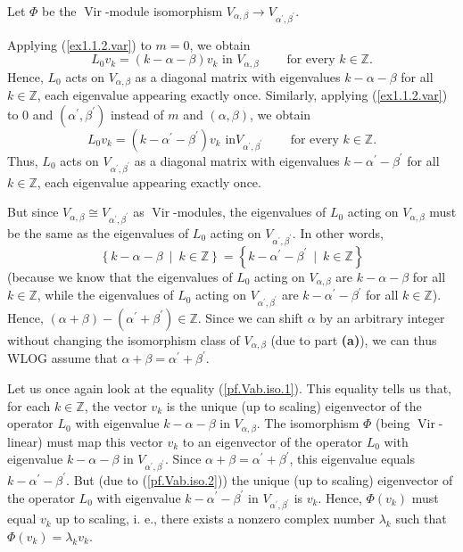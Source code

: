 \documentclass[etingof-lie.tex]{subfiles}
\begin{document}
Let $\Phi$ be the $\operatorname*{Vir}$-module isomorphism $V_{\alpha,\beta
}\rightarrow V_{\alpha^{\prime},\beta^{\prime}}$.

Applying (\ref{ex1.1.2.var}) to $m=0$, we obtain%
\begin{equation}
L_{0}v_{k}=\left(  k-\alpha-\beta\right)  v_{k}\text{ in }V_{\alpha,\beta
}\ \ \ \ \ \ \ \ \ \ \text{for every }k\in\mathbb{Z}. \label{pf.Vab.iso.1}%
\end{equation}
Hence, $L_{0}$ acts on $V_{\alpha,\beta}$ as a diagonal matrix with
eigenvalues $k-\alpha-\beta$ for all $k\in\mathbb{Z}$, each eigenvalue
appearing exactly once. Similarly, applying (\ref{ex1.1.2.var}) to $0$ and
$\left(  \alpha^{\prime},\beta^{\prime}\right)  $ instead of $m$ and $\left(
\alpha,\beta\right)  $, we obtain%
\begin{equation}
L_{0}v_{k}=\left(  k-\alpha^{\prime}-\beta^{\prime}\right)  v_{k}\text{ in
}V_{\alpha^{\prime},\beta^{\prime}}\ \ \ \ \ \ \ \ \ \ \text{for every }%
k\in\mathbb{Z}. \label{pf.Vab.iso.2}%
\end{equation}
Thus, $L_{0}$ acts on $V_{\alpha^{\prime},\beta^{\prime}}$ as a diagonal
matrix with eigenvalues $k-\alpha^{\prime}-\beta^{\prime}$ for all
$k\in\mathbb{Z}$, each eigenvalue appearing exactly once.

But since $V_{\alpha,\beta}\cong V_{\alpha^{\prime},\beta^{\prime}}$ as
$\operatorname*{Vir}$-modules, the eigenvalues of $L_{0}$ acting on
$V_{\alpha,\beta}$ must be the same as the eigenvalues of $L_{0}$ acting on
$V_{\alpha^{\prime},\beta^{\prime}}$. In other words,%
\[
\left\{  k-\alpha-\beta\ \mid\ k\in\mathbb{Z}\right\}  =\left\{
k-\alpha^{\prime}-\beta^{\prime}\ \mid\ k\in\mathbb{Z}\right\}
\]
(because we know that the eigenvalues of $L_{0}$ acting on $V_{\alpha,\beta}$
are $k-\alpha-\beta$ for all $k\in\mathbb{Z}$, while the eigenvalues of
$L_{0}$ acting on $V_{\alpha^{\prime},\beta^{\prime}}$ are $k-\alpha^{\prime
}-\beta^{\prime}$ for all $k\in\mathbb{Z}$). Hence, $\left(  \alpha
+\beta\right)  -\left(  \alpha^{\prime}+\beta^{\prime}\right)  \in\mathbb{Z}$.
Since we can shift $\alpha$ by an arbitrary integer without changing the
isomorphism class of $V_{\alpha,\beta}$ (due to part \textbf{(a)}), we can
thus WLOG assume that $\alpha+\beta=\alpha^{\prime}+\beta^{\prime}$.

Let us once again look at the equality (\ref{pf.Vab.iso.1}). This equality
tells us that, for each $k\in\mathbb{Z}$, the vector $v_{k}$ is the unique (up
to scaling) eigenvector of the operator $L_{0}$ with eigenvalue $k-\alpha
-\beta$ in $V_{\alpha,\beta}$. The isomorphism $\Phi$ (being
$\operatorname*{Vir}$-linear) must map this vector $v_{k}$ to an eigenvector
of the operator $L_{0}$ with eigenvalue $k-\alpha-\beta$ in $V_{\alpha
^{\prime},\beta^{\prime}}$. Since $\alpha+\beta=\alpha^{\prime}+\beta^{\prime
}$, this eigenvalue equals $k-\alpha^{\prime}-\beta^{\prime}$. But (due to
(\ref{pf.Vab.iso.2})) the unique (up to scaling) eigenvector of the operator
$L_{0}$ with eigenvalue $k-\alpha^{\prime}-\beta^{\prime}$ in $V_{\alpha
^{\prime},\beta^{\prime}}$ is $v_{k}$. Hence, $\Phi\left(  v_{k}\right)  $
must equal $v_{k}$ up to scaling, i. e., there exists a nonzero complex number
$\lambda_{k}$ such that $\Phi\left(  v_{k}\right)  =\lambda_{k}v_{k}$.
\end{document}
